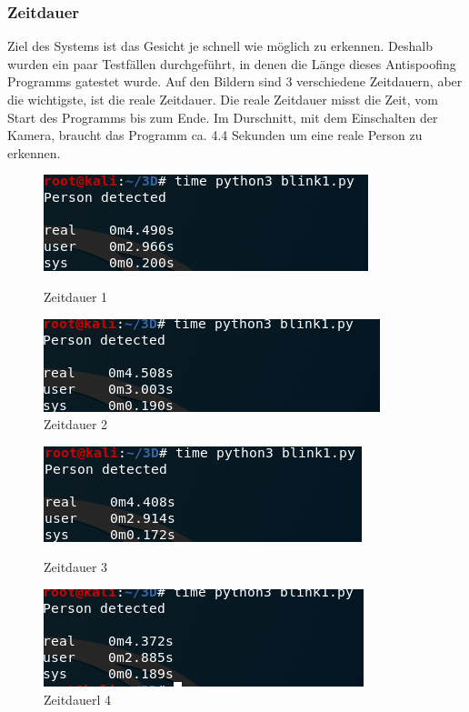 \subsubsection{Zeitdauer}
Ziel des Systems ist das Gesicht je schnell wie möglich zu erkennen. Deshalb wurden ein paar Testfällen durchgeführt, in denen die Länge dieses Antispoofing Programms gatestet wurde. Auf den Bildern sind 3 verschiedene Zeitdauern, aber die wichtigste, ist die reale Zeitdauer. Die reale Zeitdauer misst die Zeit, vom Start des Programms bis zum Ende. Im Durschnitt, mit dem Einschalten der Kamera, braucht das Programm ca. 4.4 Sekunden um eine reale Person zu erkennen.
\begin{figure}[!htb]
   \begin{minipage}{0.48\textwidth}
     \centering
     \includegraphics[width=.9\linewidth]{./figures/time1.png}
     \caption{Zeitdauer 1}
   \end{minipage}\hfill
   \begin{minipage}{0.48\textwidth}
     \centering
     \includegraphics[width=.9\linewidth]{./figures/time2.png}
     \caption{Zeitdauer 2}
   \end{minipage}
\end{figure}
\begin{figure}[!htb]
   \begin{minipage}{0.48\textwidth}
     \centering
     \includegraphics[width=.9\linewidth]{./figures/time3.png}
     \caption{Zeitdauer 3}
   \end{minipage}\hfill
   \begin{minipage}{0.48\textwidth}
     \centering
     \includegraphics[width=.9\linewidth]{./figures/time4.png}
     \caption{Zeitdauerl 4}
   \end{minipage}
\end{figure}
\newpage
